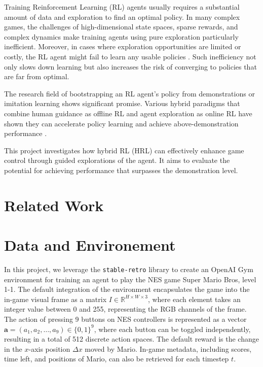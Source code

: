\documentclass{article}
\begin{document}

Training Reinforcement Learning (RL) agents usually requires a substantial 
amount of data and exploration to find an optimal policy. In many complex 
games, the challenges of high-dimensional state spaces, sparse rewards, and 
complex dynamics make training agents using pure exploration particularly 
inefficient. Moreover, in cases where exploration opportunities are limited or 
costly, the RL agent might fail to learn any usable policies \cite{Coletti2023EffectivenessOW}. 
Such inefficiency not only slows down learning but also increases the risk of 
converging to policies that are far from optimal.

The research field of bootstrapping an RL agent's policy from demonstrations or 
imitation learning shows significant promise. Various hybrid paradigms that 
combine human guidance as offline RL and agent exploration as online RL have 
shown they can accelerate policy learning and achieve above-demonstration 
performance \cite{hester_dqfd_2017,nair_bcrl_overcoming_2018, song_hybrid_2023, 
ren_hybrid_2024, Coletti2023EffectivenessOW}.

This project investigates how hybrid RL (HRL) can effectively enhance game control 
through guided explorations of the agent. It aims to evaluate the potential for 
achieving performance that surpasses the demonstration level.

\section{Related Work}

\clearpage

\section{Data and Environement}
In this project, we leverage the \texttt{stable-retro} library to create an OpenAI Gym 
environment for training an agent to play the NES game Super Mario Bros, level 1-1. The 
default integration of the environment encapsulates the game into the in-game visual 
frame as a matrix $I \in \mathbb{R}^{H \times W \times 3}$, where each element takes an 
integer value between 0 and 255, representing the RGB channels of the frame. The action 
of pressing 9 buttons on NES controllers is represented as a vector 
$\mathbf{a} = (a_1, a_2, \dots, a_9) \in \{0, 1\}^9$, where each button can be toggled 
independently, resulting in a total of 512 discrete action spaces. The default reward 
is the change in the $x$-axis position $\Delta x$ moved by Mario. In-game metadata, including 
scores, time left, and positions of Mario, can also be retrieved for each timestep $t$.
\end{document}
